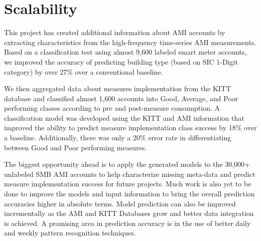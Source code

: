 \section{Scalability}
\label{sec:results_measures}

This project has created additional information about AMI accounts by extracting characteristics from the high-frequency time-series AMI measurements. Based on a classification test using almost 9,600 labeled smart meter accounts, we improved the accuracy of predicting building type (based on SIC 1-Digit category) by over 27\% over a conventional baseline. 

We then aggregated data about measures implementation from the KITT database and classified almost 1,600 accounts into Good, Average, and Poor performing classes according to pre and post-measure consumption. A classification model was developed using the KITT and AMI information that improved the ability to predict measure implementation class success by 18\% over a baseline. Additionally, there was only a 20\% error rate in differentiating between Good and Poor performing measures.

The biggest opportunity ahead is to apply the generated models to the 30,000+ unlabeled SMB AMI accounts to help characterize missing meta-data and predict measure implementation success for future projects. Much work is also yet to be done to improve the models and input information to bring the overall prediction accuracies higher in absolute terms. Model prediction can also be improved incrementally as the AMI and KITT Databases grow and better data integration is achieved. A promising area in prediction accuracy is in the use of better daily and weekly pattern recognition techniques.
